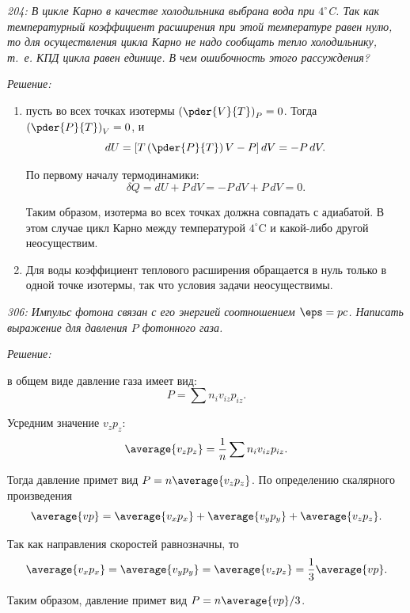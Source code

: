 \documentclass[pscyr]{hedsemwork}
\begin{document}
\newpage %

\emph{204: В цикле Карно в качестве холодильника выбрана вода при \( 4^\circ\)C.
Так как температурный коэффициент расширения при этой температуре равен нулю, то
для осуществления цикла Карно не надо сообщать тепло холодильнику, т.~е. КПД
цикла равен единице. В чем ошибочность этого рассуждения?}

\vspace*{2em}
\emph{Решение:}
\begin{enumerate}
  \item пусть во всех точках изотермы
  \( \displaystyle \left( \pder{V}{T} \right)_P = 0 \). Тогда
  \( \displaystyle \left( \pder{P}{T} \right)_V = 0 \), и
  \[
    dU = \left[ T\left(\pder{P}{T}\right)V - P \right]dV = -P\,dV.
  \]

  По первому началу термодинамики:
  \[
    \delta Q = dU + P\,dV = -P\,dV + P\,dV = 0.
  \]

  Таким образом, изотерма во всех точках должна совпадать с адиабатой. В этом
  случае цикл Карно между температурой \( 4^\circ\)C и какой-либо другой
  неосуществим.
  \item Для воды коэффициент теплового расширения обращается в нуль только в
  одной точке изотермы, так что условия задачи неосуществимы.
\end{enumerate}

\newpage %

\emph{306: Импульс фотона связан с его энергией соотношением \( \eps = pc \).
Написать выражение для давления \( P \) фотонного газа.}

\vspace*{2em}
\emph{Решение:}

в общем виде давление газа имеет вид:
\[
  P = \sum n_iv_{iz}p_{iz}.
\]

Усредним значение \( v_{z}p_{z} \):
\[
  \average{v_zp_z} = \frac{1}{n}\sum n_iv_{iz}p_{iz}.
\]

Тогда давление примет вид \( P = n\average{v_zp_z} \). По определению скалярного
произведения
\[
  \average{vp} = \average{v_xp_x} + \average{v_yp_y} + \average{v_zp_z}.
\]

Так как направления скоростей равнозначны, то
\[
  \average{v_xp_x} = \average{v_yp_y} = \average{v_zp_z} =
    \frac{1}{3}\average{vp}.
\]

Таким образом, давление примет вид \( P = n\average{vp}/3 \).
\end{document}
